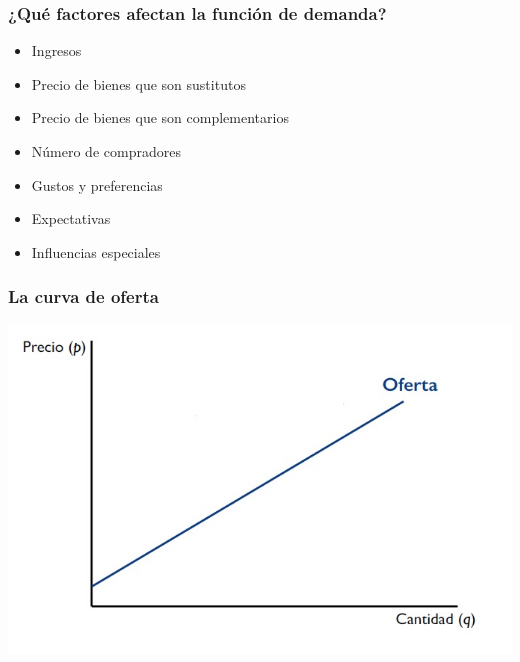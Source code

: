 \documentclass{beamer}
\begin{document}
\begin{frame}
\frametitle{¿Qué factores afectan la función de demanda?}
\begin{itemize}
    \item Ingresos %
    \item Precio de bienes que son sustitutos %
    \item Precio de bienes que son complementarios %
    \item Número de compradores %
    \item Gustos y preferencias %
    \item Expectativas %
    \item Influencias especiales %
\end{itemize}
\end{frame}





\begin{frame}
\frametitle{La curva de oferta}
\includegraphics[scale=0.6]{Slides Principios de Economia/Figures/Tema_07.2_curvadeoferta.jpg}
\end{frame}
\end{document}
